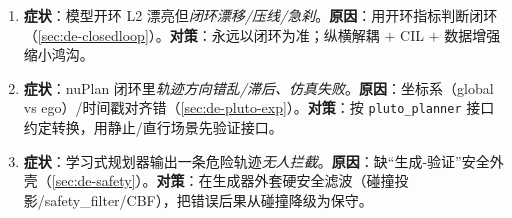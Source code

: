 \begin{enumerate}
  \item \textbf{症状}：模型开环 L2 漂亮但\emph{闭环漂移/压线/急刹}。\textbf{原因}：用开环指标判断闭环（\cref{sec:de-closedloop}）。\textbf{对策}：永远以闭环为准；纵横解耦 $+$ CIL $+$ 数据增强缩小鸿沟。
  \item \textbf{症状}：nuPlan 闭环里\emph{轨迹方向错乱/滞后、仿真失败}。\textbf{原因}：坐标系（global vs ego）/时间戳对齐错（\cref{sec:de-pluto-exp}）。\textbf{对策}：按 \texttt{pluto\_planner} 接口约定转换，用静止/直行场景先验证接口。
  \item \textbf{症状}：学习式规划器输出一条危险轨迹\emph{无人拦截}。\textbf{原因}：缺“生成-验证”安全外壳（\cref{sec:de-safety}）。\textbf{对策}：在生成器外套硬安全滤波（碰撞投影/safety\_filter/CBF），把错误后果从碰撞降级为保守。
\end{enumerate}
